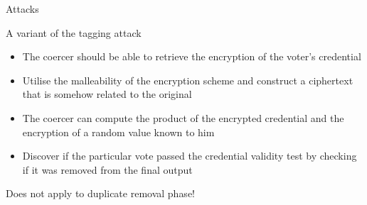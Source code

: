 \documentclass{beamer}
\begin{document}
\begin{frame}{Attacks}

A variant of the tagging attack \citep{AraujoFT07}

\begin{itemize}
\item The coercer should be able to retrieve the encryption of the voter's credential
\item Utilise the malleability of the encryption scheme and construct a ciphertext that is somehow related to the original
\item The coercer can compute the product of the encrypted credential and the encryption of a random value known to him
\item Discover if the particular vote passed the credential validity test by checking if it was removed from the final output  
\end{itemize}

Does not apply to duplicate removal phase!

\end{frame}
\end{document}
